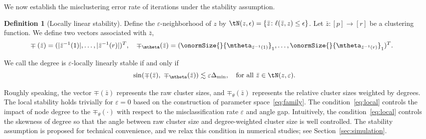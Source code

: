 \documentclass[lettersize,onecolumn,journal]{IEEEtran}
\theoremstyle{definition}
\theoremstyle{definition}
\newtheorem{defn}{Definition}
\begin{document}
We now establish the misclustering error rate of iterations under the stability assumption. 
\begin{defn}[Locally linear stability] \label{def:stable}
Define the $\varepsilon$-neighborhood of $z$ by $\tN(z,\epsilon)=\{\bar z\colon \ell(\bar z, z)\leq \epsilon\}$. Let $\bar z\colon[p]\to [r]$ be a clustering function. We define two vectors associated with $\bar z$,
\begin{align}
    &\mp(\bar z)=(|\bar z^{-1}(1)|, \ldots,|\bar z^{-1}(r)|)^T, \quad \mp_{\mtheta}(\bar z)=(\onormSize{}{\mtheta_{\bar z^{-1}(1)}}_1,\ldots,\onormSize{}{\mtheta_{\bar z^{-1}(r)}}_1)^T.
\end{align}

We call the degree is $\varepsilon$-locally linearly stable if and only if 
\begin{equation}\label{eq:local}
    \sin(\mp(\bar z),\ \mp_{\mtheta}(\bar z))\lesssim \varepsilon \Delta_{\min} ,\quad \text{for all } \bar z\in \tN(z, \varepsilon).
\end{equation}
\end{defn}

Roughly speaking, the vector $\mp(\bar z)$ represents the raw cluster sizes, and $\mp_{\theta}(\bar z)$ represents the relative cluster sizes weighted by degrees. 
The local stability holds trivially for $\varepsilon=0$ based on the construction of parameter space~\eqref{eq:family}. The condition~\eqref{eq:local} controls the impact of node degree to the $\mp_{\theta}(\cdot)$ with respect to the misclassification rate $\varepsilon$ and angle gap.   {Intuitively, the condition~\eqref{eq:local} controls the skewness of degree so that the angle between raw cluster size and degree-weighted cluster size is well controlled. The stability assumption is proposed for technical convenience, and we relax this condition in numerical studies; see Section~\ref{sec:simulation}.}
\end{document}
